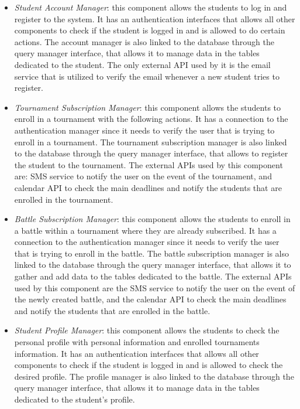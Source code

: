 \documentclass[12pt, a4paper]{report}
\begin{document}
    \begin{itemize}
        \item \textit{Student Account Manager}: this component allows the students to log in and register to the system.
            It has an authentication interfaces that allows all other components to check if the student is logged in and is allowed to do certain actions. 
            The account manager is also linked to the database through the query manager interface, that allows it to manage data in the tables dedicated to the student.
            The only external API used by it is the email service that is utilized to verify the email whenever a new student tries to register. 
        \item \textit{Tournament Subscription Manager}: this component allows the students to enroll in a tournament with the following actions.
            It has a connection to the authentication manager since it needs to verify the user that is trying to enroll in a tournament. 
            The tournament subscription manager is also linked to the database through the query manager interface, that allows to register the student to the tournament. 
            The external APIs used by this component are: SMS service to notify the user on the event of the tournament, and calendar API to check the main deadlines and notify the students that are enrolled in the tournament.
        \item \textit{Battle Subscription Manager}: this component allows the students to enroll in a battle within a tournament where they are already subscribed. 
            It has a connection to the authentication manager since it needs to verify the user that is trying to enroll in the battle. 
            The battle subscription manager is also linked to the database through the query manager interface, that allows it to gather and add data to the tables dedicated to the battle.
            The external APIs used by this component are the SMS service to notify the user on the event of the newly created battle, and the calendar API to check the main deadlines and notify the students that are enrolled in the battle.
        \item \textit{Student Profile Manager}: this component allows the students to check the personal profile with personal information and enrolled tournaments information. 
            It has an authentication interfaces that allows all other components to check if the student is logged in and is allowed to check the desired profile. 
            The profile manager is also linked to the database through the query manager interface, that allows it to manage data in the tables dedicated to the student's profile.

\end{itemize}
\end{document}
